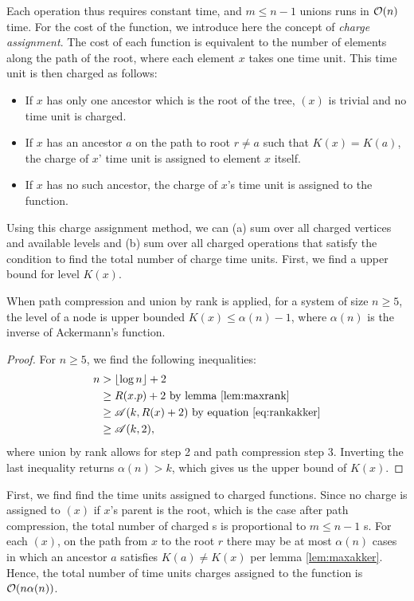 Each  operation thus requires constant time, and $m\leq n-1$ unions runs in $\mathcal{O}(n)$ time. For the cost of the  function, we introduce here the concept of \emph{charge assignment}. The cost of each  function is equivalent to the number of elements along the path of the root, where each element $x$ takes one time unit. This time unit is then charged as follows:
\begin{itemize}
  \item If $x$ has only one ancestor which is the root of the tree, $(x)$ is trivial and no time unit is charged. 
  \item If $x$ has an ancestor $a$ on the path to root $r\neq a$ such that $K(x)=K(a)$, the charge of $x$' time unit is assigned to element $x$ itself.
  \item If $x$ has no such ancestor, the charge of $x$'s time unit is assigned to the  function.
\end{itemize}
Using this charge assignment method, we can (a) sum over all charged vertices and available levels and (b) sum over all charged  operations that satisfy the condition to find the total number of charge time units. First, we find a upper bound for level $K(x)$. 

\begin{lemma}\label{lem:maxakker}
  When path compression and union by rank is applied, for a system of size $n\geq 5$, the level of a node is upper bounded $K(x) \leq \alpha(n) -1$, where $\alpha(n)$ is the inverse of Ackermann's function. 
\end{lemma}
\begin{proof}
  For $n\geq 5$, we find the following inequalities:
  \begin{align*}
    n &> \lfloor \log n \rfloor + 2 \\
    &\geq R(x.p) + 2 \text{ by lemma \ref{lem:maxrank}}\\
    &\geq \mathscr{A}(k,R(x)+2) \text{ by equation \eqref{eq:rankakker}}\\
    &\geq \mathscr{A}(k,2),
  \end{align*}
  where union by rank allows for step 2 and path compression step 3. Inverting the last inequality returns $\alpha(n) > k$, which gives us the upper bound of $K(x)$. 
\end{proof}

First, we find find the time units assigned to charged  functions. Since no charge is assigned to $(x)$ if $x$'s parent is the root, which is the case after path compression, the total number of charged s is proportional to $m\leq n-1$ s. For each $(x)$, on the path from $x$ to the root $r$ there may be at most $\alpha(n)$ cases in which an ancestor $a$ satisfies $K(a)\neq K(x)$ per lemma \ref{lem:maxakker}. Hence, the total number of time units charges assigned to the  function is $\mathcal{O}(n\alpha(n))$. 

